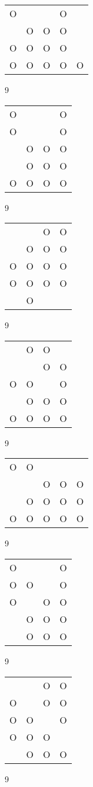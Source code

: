 \begin{tabular}{|m{0.2cm}m{0.2cm}m{0.2cm}m{0.2cm}m{0.2cm}|}\hline
O& & &O& \\
 &O&O&O& \\
O&O&O&O& \\
O&O&O&O&O\\
\hline\end{tabular}9
\begin{tabular}{|m{0.2cm}m{0.2cm}m{0.2cm}m{0.2cm}|}\hline
O& & &O\\
O& & &O\\
 &O&O&O\\
 &O&O&O\\
O&O&O&O\\
\hline\end{tabular}9
\begin{tabular}{|m{0.2cm}m{0.2cm}m{0.2cm}m{0.2cm}|}\hline
 & &O&O\\
 &O&O&O\\
O&O&O&O\\
O&O&O&O\\
 &O& & \\
\hline\end{tabular}9
\begin{tabular}{|m{0.2cm}m{0.2cm}m{0.2cm}m{0.2cm}|}\hline
 &O&O& \\
 & &O&O\\
O&O& &O\\
 &O&O&O\\
O&O&O&O\\
\hline\end{tabular}9
\begin{tabular}{|m{0.2cm}m{0.2cm}m{0.2cm}m{0.2cm}m{0.2cm}|}\hline
O&O& & & \\
 & &O&O&O\\
 &O&O&O&O\\
O&O&O&O&O\\
\hline\end{tabular}9
\begin{tabular}{|m{0.2cm}m{0.2cm}m{0.2cm}m{0.2cm}|}\hline
O& & &O\\
O&O& &O\\
O& &O&O\\
 &O&O&O\\
 &O&O&O\\
\hline\end{tabular}9
\begin{tabular}{|m{0.2cm}m{0.2cm}m{0.2cm}m{0.2cm}|}\hline
 & &O&O\\
O& &O&O\\
O&O& &O\\
O&O&O& \\
 &O&O&O\\
\hline\end{tabular}9
